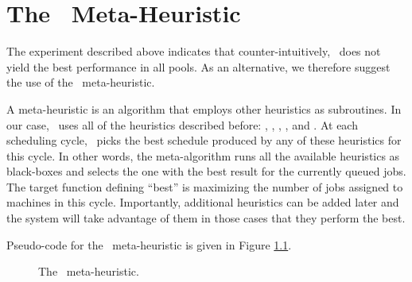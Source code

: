 

\chapter{The \maj\ Meta-Heuristic}
\label{sec:max-jobs}

The experiment described above indicates that counter-intuitively, 
\mif\ does not yield the best performance in all pools.
As an alternative, we therefore suggest the use of the \maj\ meta-heuristic.


A meta-heuristic is an algorithm that employs other heuristics as
subroutines.
In our case, \maj\ uses all of the heuristics described before: \bfc,
\bfm, \wfc, \wfm, and \mif.
At each scheduling cycle, \maj\ picks the best schedule produced by
any of these heuristics for this cycle.
In other words, the meta-algorithm runs all the available heuristics
as black-boxes and selects the one with the best result for the
currently queued jobs.
The target function defining ``best'' is maximizing the
number of jobs assigned to machines in this cycle.
Importantly, additional heuristics can be added later and the system
will take advantage of them in those cases that they perform the best.

Pseudo-code for the \maj\ meta-heuristic is given in Figure
\ref{fig:max-jobs}.

\begin{figure}\centering
{}
  \caption{The \maj\ meta-heuristic.}
  \label{fig:max-jobs}
\end{figure}


